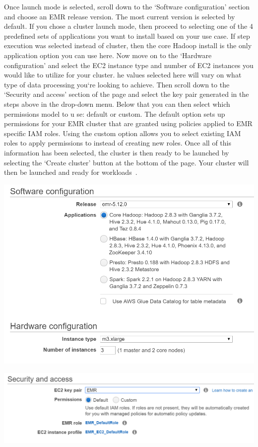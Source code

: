 Once launch mode is selected, scroll down to the `Software configuration' 
section and choose an EMR release version. The most current version is 
selected by default. If you chose a cluster launch mode, then proceed to 
selecting one of the 4 predefined sets of applications you want to install 
based on your use case. If step execution was selected instead of cluster, 
then the core Hadoop install is the only application option you can use 
here. Now move on to the `Hardware configuration' and select the EC2 instance 
type and number of EC2 instances you would like to utilize for your cluster. 
he values selected here will vary on what type of data processing you`re 
looking to achieve. Then scroll down to the `Security and access' section 
of the page and select the key pair generated in the steps above in the 
drop-down menu. Below that you can then select which permissions model to u
se: default or custom. The default option sets up permissions for your EMR 
cluster that are granted using policies applied to EMR specific IAM roles. 
Using the custom option allows you to select existing IAM roles to apply 
permissions to instead of creating new roles. Once all of this information 
has been selected, the cluster is then ready to be launched by selecting 
the `Create cluster' button at the bottom of the page. Your cluster will 
then be launched and ready for workloads~\cite{hid-sp18-521-emrlaunch}. 

\begin{center}
\centering\includegraphics[width=\columnwidth]{images/emr_software_config.png}

\centering\includegraphics[width=\columnwidth]{images/emr_security.png}
\end{center}

